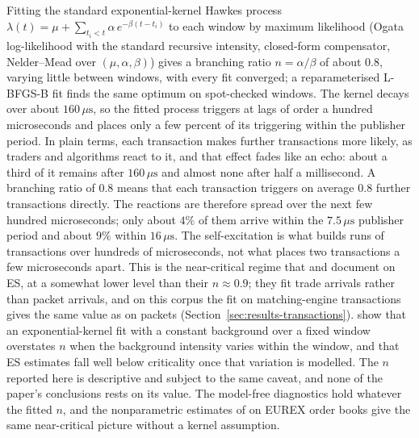 \documentclass[11pt]{article}
\begin{document}
Fitting the standard exponential-kernel Hawkes process \citep{hawkes1971spectra}
$\lambda(t) = \mu + \sum_{t_i < t} \alpha\, e^{-\beta(t - t_i)}$ to each window by maximum
likelihood \citep{ozaki1979} (Ogata log-likelihood with the standard recursive intensity,
closed-form compensator, Nelder--Mead over $(\mu, \alpha, \beta)$) gives a branching ratio
$n = \alpha/\beta$ of about $0.8$, varying little between windows, with every fit
converged; a reparameterised L-BFGS-B fit finds the same optimum on spot-checked windows.
The kernel decays over about $160\,\mu\mathrm{s}$, so the fitted process triggers at lags of
order a hundred microseconds and places only a few percent of its triggering within the
publisher period. In plain terms, each transaction makes further transactions more
likely, as traders and algorithms react to it, and that effect fades like an echo: about a
third of it remains after $160\,\mu\mathrm{s}$ and almost none after half a millisecond. A
branching ratio of $0.8$ means that each transaction triggers on average $0.8$ further
transactions directly. The reactions are therefore spread over the next few hundred
microseconds; only about $4\%$ of them arrive within the $7.5\,\mu\mathrm{s}$ publisher
period and about $9\%$ within $16\,\mu\mathrm{s}$. The self-excitation is what builds runs
of transactions over hundreds of microseconds, not what places two transactions a few
microseconds apart. This is the near-critical regime that \citet{filimonovsornette2012} and
\citet{hardimanbercotbouchaud2013} document on ES, at a somewhat lower level than their
$n \approx 0.9$; they fit trade arrivals rather than packet arrivals, and on this corpus
the fit on matching-engine transactions gives the same value as on packets
(Section~\ref{sec:results-transactions}). \citet{filimonovsornette2015} show that an exponential-kernel fit with a constant
background over a fixed window overstates $n$ when the background intensity varies within
the window, and that ES estimates fall well below criticality once that variation is
modelled. The $n$ reported here is descriptive and subject to the same caveat, and none of
the paper's conclusions rests on its value. The
model-free diagnostics hold whatever the fitted $n$, and the nonparametric estimates of
\citet{achab2018branching} on EUREX order books give the same near-critical picture
without a kernel assumption.
\end{document}
